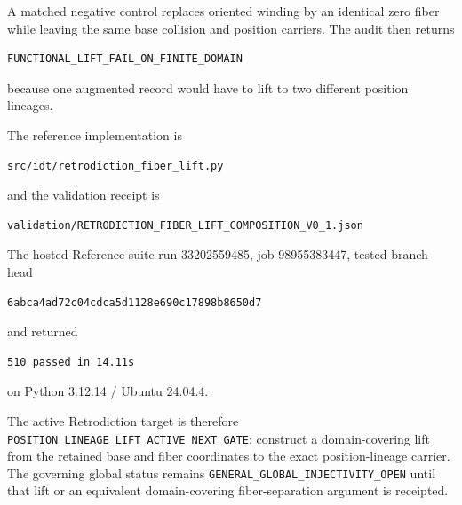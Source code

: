 A matched negative control replaces oriented winding by an identical zero fiber while leaving the same base collision and position carriers.  The audit then returns
\begin{verbatim}
FUNCTIONAL_LIFT_FAIL_ON_FINITE_DOMAIN
\end{verbatim}
because one augmented record would have to lift to two different position lineages.

The reference implementation is
\begin{verbatim}
src/idt/retrodiction_fiber_lift.py
\end{verbatim}
and the validation receipt is
\begin{verbatim}
validation/RETRODICTION_FIBER_LIFT_COMPOSITION_V0_1.json
\end{verbatim}
The hosted Reference suite run 33202559485, job 98955383447, tested branch head
\begin{verbatim}
6abca4ad72c04cdca5d1128e690c17898b8650d7
\end{verbatim}
and returned
\begin{verbatim}
510 passed in 14.11s
\end{verbatim}
on Python 3.12.14 / Ubuntu 24.04.4.

The active Retrodiction target is therefore \texttt{POSITION\_LINEAGE\_LIFT\_ACTIVE\_NEXT\_GATE}: construct a domain-covering lift from the retained base and fiber coordinates to the exact position-lineage carrier.  The governing global status remains \texttt{GENERAL\_GLOBAL\_INJECTIVITY\_OPEN} until that lift or an equivalent domain-covering fiber-separation argument is receipted.
